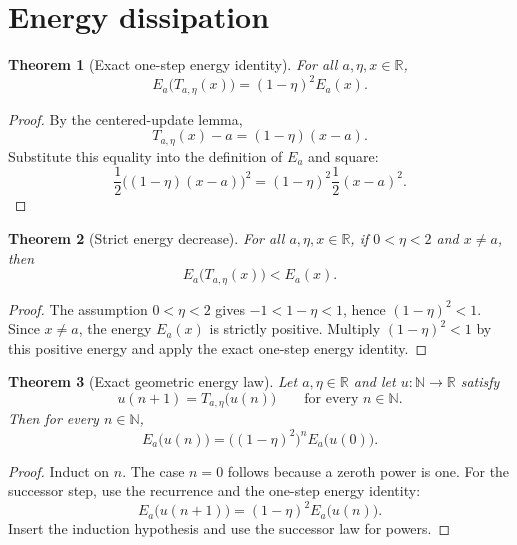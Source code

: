 \documentclass[11pt]{article}
\newtheorem{theorem}{Theorem}
\newcommand{\R}{\mathbb{R}}
\newcommand{\N}{\mathbb{N}}
\begin{document}
\section{Energy dissipation}

\begin{theorem}[Exact one-step energy identity]\label{thm:descent-energy-step}
For all $a,\eta,x\in\R$,
\[
  E_a\bigl(T_{a,\eta}(x)\bigr)=(1-\eta)^2 E_a(x).
\]
\end{theorem}
\begin{proof}
By the centered-update lemma,
\[
  T_{a,\eta}(x)-a=(1-\eta)(x-a).
\]
Substitute this equality into the definition of $E_a$ and square:
\[
  \frac12\bigl((1-\eta)(x-a)\bigr)^2
  =(1-\eta)^2\frac12(x-a)^2.
\]
\end{proof}

\begin{theorem}[Strict energy decrease]\label{thm:descent-strict}
For all $a,\eta,x\in\R$, if $0<\eta<2$ and $x\ne a$, then
\[
  E_a\bigl(T_{a,\eta}(x)\bigr)<E_a(x).
\]
\end{theorem}
\begin{proof}
The assumption $0<\eta<2$ gives $-1<1-\eta<1$, hence
$(1-\eta)^2<1$. Since $x\ne a$, the energy $E_a(x)$ is
strictly positive. Multiply $(1-\eta)^2<1$ by this positive
energy and apply the exact one-step energy identity.
\end{proof}

\begin{theorem}[Exact geometric energy law]\label{thm:descent-geometric}
Let $a,\eta\in\R$ and let $u:\N\to\R$ satisfy
\[
  u(n+1)=T_{a,\eta}\bigl(u(n)\bigr)
  \qquad\text{for every }n\in\N.
\]
Then for every $n\in\N$,
\[
  E_a\bigl(u(n)\bigr)=\bigl((1-\eta)^2\bigr)^n E_a\bigl(u(0)\bigr).
\]
\end{theorem}
\begin{proof}
Induct on $n$. The case $n=0$ follows because a zeroth power is one.
For the successor step, use the recurrence and the one-step energy identity:
\[
  E_a\bigl(u(n+1)\bigr)=(1-\eta)^2 E_a\bigl(u(n)\bigr).
\]
Insert the induction hypothesis and use the successor law for powers.
\end{proof}
\end{document}
